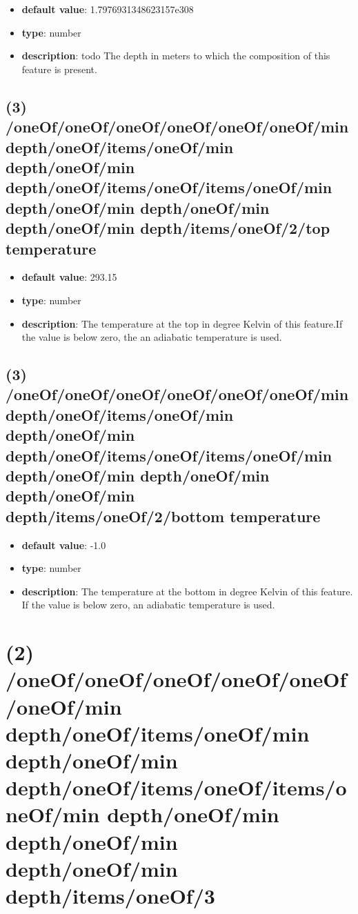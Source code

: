 \begin{itemize}[leftmargin=3em]\item {\bf default value}: 1.7976931348623157e308
\item {\bf type}: number
\item {\bf description}: todo The depth in meters to which the composition of this feature is present.
\end{itemize}\subsection{(3) /oneOf/oneOf/oneOf/oneOf/oneOf/oneOf/min depth/oneOf/items/oneOf/min depth/oneOf/min depth/oneOf/items/oneOf/items/oneOf/min depth/oneOf/min depth/oneOf/min depth/oneOf/min depth/items/oneOf/2/top temperature}
\begin{itemize}[leftmargin=3em]\item {\bf default value}: 293.15
\item {\bf type}: number
\item {\bf description}: The temperature at the top in degree Kelvin of this feature.If the value is below zero, the an adiabatic temperature is used.
\end{itemize}\subsection{(3) /oneOf/oneOf/oneOf/oneOf/oneOf/oneOf/min depth/oneOf/items/oneOf/min depth/oneOf/min depth/oneOf/items/oneOf/items/oneOf/min depth/oneOf/min depth/oneOf/min depth/oneOf/min depth/items/oneOf/2/bottom temperature}
\begin{itemize}[leftmargin=3em]\item {\bf default value}: -1.0
\item {\bf type}: number
\item {\bf description}: The temperature at the bottom in degree Kelvin of this feature. If the value is below zero, an adiabatic temperature is used.
\end{itemize}\section{(2) /oneOf/oneOf/oneOf/oneOf/oneOf/oneOf/min depth/oneOf/items/oneOf/min depth/oneOf/min depth/oneOf/items/oneOf/items/oneOf/min depth/oneOf/min depth/oneOf/min depth/oneOf/min depth/items/oneOf/3}
